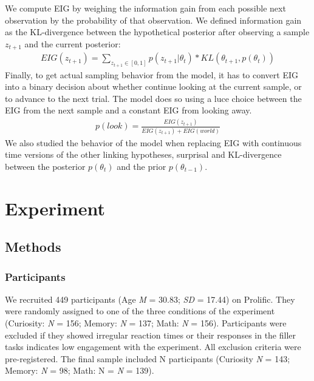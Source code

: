 \documentclass[10pt, letterpaper]{article}
\begin{document}
We compute EIG by weighing the information gain from each possible next observation by the probability of that observation. We defined information gain as the KL-divergence between the hypothetical posterior after observing a sample \(z_{t+1}\) and the current posterior:
\begin{eqnarray}
EIG(z_{t+1}) = \sum_{z_{t+1} \in [0,1]} p(z_{t+1}|\theta_t) * KL(\theta_{t+1}, p(\theta_t))
\end{eqnarray}
Finally, to get actual sampling behavior from the model, it has to convert EIG into a binary decision about whether continue looking at the current sample, or to advance to the next trial. The model does so using a luce choice between the EIG from the next sample and a constant EIG from looking away.
\begin{eqnarray}
p(look) = \frac{EIG(z_{t+1})}{EIG(z_{t+1})+EIG(world)}
\end{eqnarray}
We also studied the behavior of the model when replacing EIG with continuous time versions of the other linking hypotheses, surprisal and KL-divergence between the posterior \(p(\theta_t)\) and the prior \(p(\theta_{t-1})\).

\hypertarget{experiment}{%
\section{Experiment}\label{experiment}}

\hypertarget{methods}{%
\subsection{Methods}\label{methods}}

\hypertarget{participants}{%
\subsubsection{Participants}\label{participants}}

We recruited 449 participants (Age \emph{M} = 30.83; \emph{SD} = 17.44) on Prolific. They were randomly assigned to one of the three conditions of the experiment (Curiosity: \emph{N} = 156; Memory: \emph{N} = 137; Math: \emph{N} = 156). Participants were excluded if they showed irregular reaction times or their responses in the filler tasks indicates low engagement with the experiment. All exclusion criteria were pre-registered. The final sample included N participants (Curiosity \emph{N} = 143; Memory: \emph{N} = 98; Math: N = \emph{N} = 139).
\end{document}
